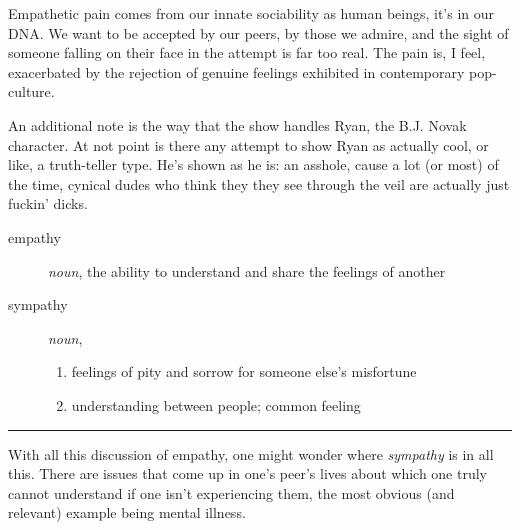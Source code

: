 \documentclass[../butidigress.tex]{subfiles}
\begin{document}
Empathetic pain comes from our innate sociability as human beings, it's in our DNA\@.
We want to be accepted by our peers, by those we admire, and the sight of someone falling on their face in the attempt is far too real.
The pain is, I feel, exacerbated by the rejection of genuine feelings exhibited in contemporary pop-culture.

An additional note is the way that the show handles Ryan, the B.J. Novak character.
At not point is there any attempt to show Ryan as actually cool, or like, a truth-teller type.
He's shown as he is: an asshole, cause a lot (or most) of the time, cynical dudes who think they they see through the veil are actually just fuckin' dicks.

\begin{description}
    \item [empathy] \textit{noun}, the ability to understand and share the feelings of another
    \item [sympathy] \textit{noun},

    \begin{enumerate}
        \item feelings of pity and sorrow for someone else's misfortune
        \item understanding between people; common feeling
    \end{enumerate}
\end{description}

\vspace{0.1cm}\noindent\hfill\rule{0.5\textwidth}{0.5pt}\hfill\vspace{0.5cm}

With all this discussion of empathy, one might wonder where \emph{sympathy} is in all this.
There are issues that come up in one's peer's lives about which one truly cannot understand if one isn't experiencing them, the most obvious (and relevant) example being mental illness.
\end{document}
